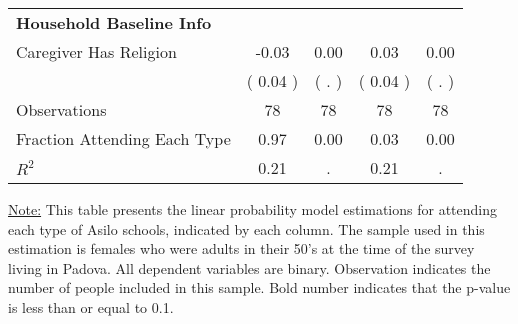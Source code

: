 \begin{table}[H]
{\begin{tabular}{lcccc}
\midrule
\textbf{Household Baseline Info} \\
\quad Caregiver Has Religion &     -0.03 &      0.00 &      0.03 &      0.00 \\
\quad  & (     0.04 ) & (        . )  & (     0.04 )  & (        . )  \\
\midrule
Observations & 78 & 78 & 78 & 78 \\
Fraction Attending Each Type &      0.97 &      0.00 &      0.03 &      0.00 \\
\midrule
$ R^2$ &      0.21 &         . &      0.21 &         . \\
\bottomrule
\end{tabular}}
\end{table}
\begin{footnotesize}
\noindent\underline{Note:} This table presents the linear probability model estimations for attending each type of Asilo schools, indicated by each column. The sample used in this estimation is females who were adults in their 50's at the time of the survey living in Padova. All dependent variables are binary. Observation indicates the number of people included in this sample. Bold number indicates that the p-value is less than or equal to 0.1.
\end{footnotesize}
